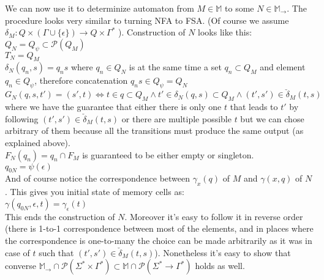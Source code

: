\documentclass[12pt]{article}
\begin{document}
\begin{enumerate}
 We can now use it to determinize automaton from $M\in\mathbb{M}$ to some $N\in\mathbb{M}_\rightarrow$. The procedure looks very similar to turning NFA to FSA. (Of course we assume $\delta_M : Q \times (\Gamma \cup \{\epsilon \}) \rightarrow Q \times \Gamma^*$ ).
Construction of $N$ looks like this:\\
$Q_N = Q_\psi \subset \mathcal{P}(Q_M) $ \\
$T_N = Q_M $ \\
$\delta_N(q_n,s) = q_n s $ where $q_n\in Q_N$ is at the same time a set $q_n \subset Q_M$ and element $q_n \in Q_\psi $, therefore concatenation $q_ns \in Q_\psi = Q_N$\\
$G_N(q,s,t') = (s',t) \iff t \in q \subset  Q_M \wedge t' \in \delta_N(q,s) \subset  Q_M \wedge (t',s') \in \check{\delta}_M(t,s) $ where we have the guarantee that either there is only one $t$ that leads  to $t'$ by following $(t',s') \in \check{\delta}_M(t,s)$ or there are multiple possible $t$ but we can chose arbitrary of them because all the transitions must produce the same output (as explained above).\\
$F_N(q_n) = q_n \cap F_M$ is guaranteed to be either empty or singleton. \\
$q_{0N} = \psi(\epsilon)$ \\
And of course notice the correspondence between $\gamma_x(q)$ of $M$ and $\gamma(x,q)$ of $N$. This gives you initial state of memory cells as: \\
$\gamma(q_{0N},\epsilon,t) = \gamma_\epsilon(t)$ \\

This ends the construction of $N$. Moreover it's easy to follow it in reverse order (there is 1-to-1 correspondence between most of the elements, and in places where the correspondence is one-to-many the choice can be made arbitrarily as it was in case of $t$ such that $(t',s') \in \check{\delta}_M(t,s)$). Nonetheless it's easy to show that converse $\mathbb{M}_\rightarrow \cap \mathcal{P}(\Sigma^* \times \Gamma^*) \subset   \mathbb{M} \cap \mathcal{P}(\Sigma^* \rightarrow \Gamma^*) $ holds as well.



\end{enumerate}
\end{document}
